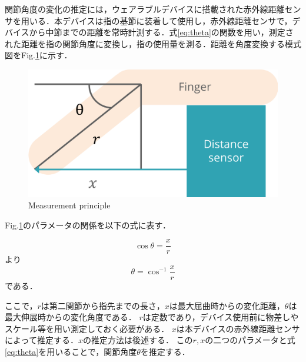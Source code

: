 関節角度の変化の推定には，ウェアラブルデバイスに搭載された赤外線距離センサを用いる．本デバイスは指の基節に装着して使用し，赤外線距離センサで，デバイスから中節までの距離を常時計測する．式\ref{eq:theta}の関数を用い，測定された距離を指の関節角度に変換し，指の使用量を測る．距離を角度変換する模式図をFig.\ref{fig:principle}に示す．

\begin{figure}[H]
  \centering
  \includegraphics[width=0.8\linewidth]{fig/principle}
  \caption{Measurement principle}
  \label{fig:principle}
\end{figure}
Fig.\ref{fig:principle}のパラメータの関係を以下の式に表す．

\begin{equation}
\cos\theta = \frac{x}{r} 
\end{equation}
より
\begin{equation}
\theta = \cos^{-1} \frac{x}{r}
\label{eq:theta}
\end{equation}
である．

ここで，$r$は第二関節から指先までの長さ，$x$は最大屈曲時からの変化距離，$\theta$は最大伸展時からの変化角度である．
$r$は定数であり，デバイス使用前に物差しやスケール等を用い測定しておく必要がある．
$x$は本デバイスの赤外線距離センサによって推定する．$x$の推定方法は後述する．
この$r,x$の二つのパラメータと式\ref{eq:theta}を用いることで，関節角度$\theta$を推定する．

